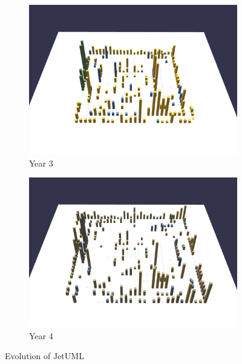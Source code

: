 \begin{figure}[h!]
    \medskip
    \begin{subfigure}{0.48\textwidth}
        \includegraphics[width=\linewidth]{JetUML_V3S3.png}
        \caption{Year 3} 
        \label{fig:JetUML_V3S3}
    \end{subfigure}\hspace*{\fill}
    \begin{subfigure}{0.48\textwidth}
        \includegraphics[width=\linewidth]{JetUML_V3S4.png}
        \caption{Year 4} 
        \label{fig:JetUML_V3S4}
    \end{subfigure}
        
    \caption{Evolution of JetUML} 
    \label{fig:JetUML_V3}
\end{figure}

